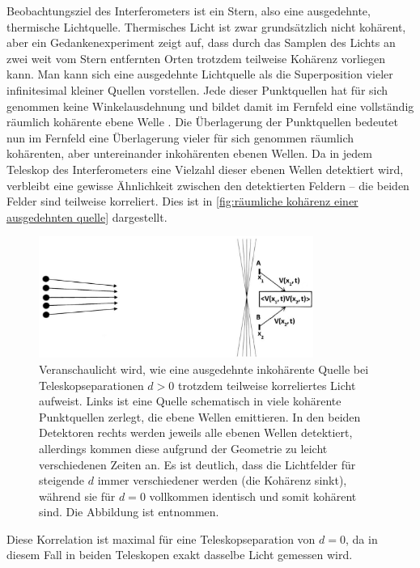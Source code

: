 Beobachtungsziel des Interferometers ist ein Stern, also eine ausgedehnte, thermische Lichtquelle. 
Thermisches Licht ist zwar grundsätzlich nicht kohärent, aber ein Gedankenexperiment zeigt auf, dass durch das Samplen des Lichts an zwei weit vom Stern entfernten Orten trotzdem teilweise Kohärenz vorliegen kann. 
Man kann sich eine ausgedehnte Lichtquelle als die Superposition vieler infinitesimal kleiner Quellen vorstellen. 
Jede dieser Punktquellen hat für sich genommen keine Winkelausdehnung und bildet damit im Fernfeld eine vollständig räumlich kohärente ebene Welle \cite[Kap. 6.1]{foxQuantumOpticsIntroduction2006}. 
Die Überlagerung der Punktquellen bedeutet nun im Fernfeld eine Überlagerung vieler für sich genommen räumlich kohärenten, aber untereinander inkohärenten ebenen Wellen. 
Da in jedem Teleskop des Interferometers eine Vielzahl dieser ebenen Wellen detektiert wird, verbleibt eine gewisse Ähnlichkeit zwischen den detektierten Feldern -- die beiden Felder sind teilweise korreliert. 
Dies ist in \autoref{fig:räumliche kohärenz einer ausgedehnten quelle} dargestellt. 
\begin{figure}[h]
    \centering
    \includegraphics[width=0.8\textwidth]{images/Theorie/Burke_9.25.png}
    \caption{Veranschaulicht wird, wie eine ausgedehnte inkohärente Quelle bei Teleskopseparationen $d>0$ trotzdem teilweise korreliertes Licht aufweist. Links ist eine Quelle schematisch in viele kohärente Punktquellen zerlegt, die ebene Wellen emittieren. In den beiden Detektoren rechts werden jeweils alle ebenen Wellen detektiert, allerdings kommen diese aufgrund der Geometrie zu leicht verschiedenen Zeiten an. Es ist deutlich, dass die Lichtfelder für steigende $d$ immer verschiedener werden (die Kohärenz sinkt), während sie für $d=0$ vollkommen identisch und somit kohärent sind. Die Abbildung ist \cite[Fig. 9.25]{burkeIntroductionRadioAstronomy2019} entnommen.}
    \label{fig:räumliche kohärenz einer ausgedehnten quelle}
\end{figure}
Diese Korrelation ist maximal für eine Teleskopseparation von $d=0$, da in diesem Fall in beiden Teleskopen exakt dasselbe Licht gemessen wird. 
